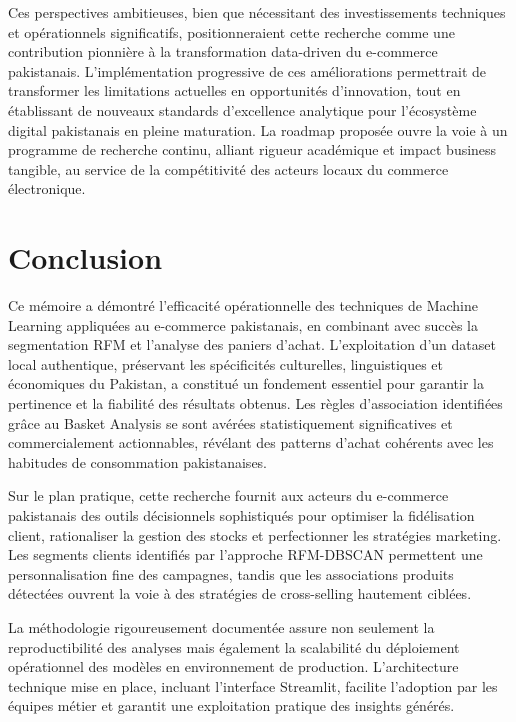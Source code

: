 \documentclass[a4paper,12pt]{article}
\begin{document}
Ces perspectives ambitieuses, bien que nécessitant des investissements techniques et opérationnels significatifs, positionneraient cette recherche comme une contribution pionnière à la transformation data-driven du e-commerce pakistanais. L'implémentation progressive de ces améliorations permettrait de transformer les limitations actuelles en opportunités d'innovation, tout en établissant de nouveaux standards d'excellence analytique pour l'écosystème digital pakistanais en pleine maturation. La roadmap proposée ouvre la voie à un programme de recherche continu, alliant rigueur académique et impact business tangible, au service de la compétitivité des acteurs locaux du commerce électronique.


\chapter*{Conclusion}
\renewcommand{\thepage}{\Roman{page}}
\setcounter{page}{1} %

Ce mémoire a démontré l'efficacité opérationnelle des techniques de Machine Learning appliquées au e-commerce pakistanais, en combinant avec succès la segmentation RFM et l'analyse des paniers d'achat. L'exploitation d'un dataset local authentique, préservant les spécificités culturelles, linguistiques et économiques du Pakistan, a constitué un fondement essentiel pour garantir la pertinence et la fiabilité des résultats obtenus. Les règles d'association identifiées grâce au Basket Analysis se sont avérées statistiquement significatives et commercialement actionnables, révélant des patterns d'achat cohérents avec les habitudes de consommation pakistanaises.

Sur le plan pratique, cette recherche fournit aux acteurs du e-commerce pakistanais des outils décisionnels sophistiqués pour optimiser la fidélisation client, rationaliser la gestion des stocks et perfectionner les stratégies marketing. Les segments clients identifiés par l'approche RFM-DBSCAN permettent une personnalisation fine des campagnes, tandis que les associations produits détectées ouvrent la voie à des stratégies de cross-selling hautement ciblées.

La méthodologie rigoureusement documentée assure non seulement la reproductibilité des analyses mais également la scalabilité du déploiement opérationnel des modèles en environnement de production. L'architecture technique mise en place, incluant l'interface Streamlit, facilite l'adoption par les équipes métier et garantit une exploitation pratique des insights générés.
\end{document}
